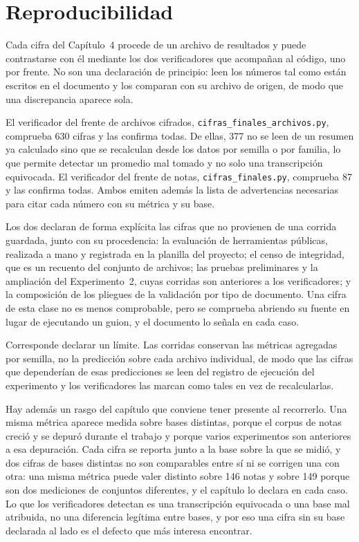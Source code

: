 \section{Reproducibilidad}
\label{apx:reproducibilidad}

Cada cifra del Capítulo~4 procede de un archivo de resultados y puede contrastarse con él mediante los dos verificadores que acompañan al código, uno por frente. No son una declaración de principio: leen los números tal como están escritos en el documento y los comparan con su archivo de origen, de modo que una discrepancia aparece sola.

El verificador del frente de archivos cifrados, \texttt{cifras\_finales\_archivos.py}, comprueba 630 cifras y las confirma todas. De ellas, 377 no se leen de un resumen ya calculado sino que se recalculan desde los datos por semilla o por familia, lo que permite detectar un promedio mal tomado y no solo una transcripción equivocada. El verificador del frente de notas, \texttt{cifras\_finales.py}, comprueba 87 y las confirma todas. Ambos emiten además la lista de advertencias necesarias para citar cada número con su métrica y su base.

Los dos declaran de forma explícita las cifras que no provienen de una corrida guardada, junto con su procedencia: la evaluación de herramientas públicas, realizada a mano y registrada en la planilla del proyecto; el censo de integridad, que es un recuento del conjunto de archivos; las pruebas preliminares y la ampliación del Experimento~2, cuyas corridas son anteriores a los verificadores; y la composición de los pliegues de la validación por tipo de documento. Una cifra de esta clase no es menos comprobable, pero se comprueba abriendo su fuente en lugar de ejecutando un guion, y el documento lo señala en cada caso.

Corresponde declarar un límite. Las corridas conservan las métricas agregadas por semilla, no la predicción sobre cada archivo individual, de modo que las cifras que dependerían de esas predicciones se leen del registro de ejecución del experimento y los verificadores las marcan como tales en vez de recalcularlas.

Hay además un rasgo del capítulo que conviene tener presente al recorrerlo. Una misma métrica aparece medida sobre bases distintas, porque el corpus de notas creció y se depuró durante el trabajo y porque varios experimentos son anteriores a esa depuración. Cada cifra se reporta junto a la base sobre la que se midió, y dos cifras de bases distintas no son comparables entre sí ni se corrigen una con otra: una misma métrica puede valer distinto sobre 146 notas y sobre 149 porque son dos mediciones de conjuntos diferentes, y el capítulo lo declara en cada caso. Lo que los verificadores detectan es una transcripción equivocada o una base mal atribuida, no una diferencia legítima entre bases, y por eso una cifra sin su base declarada al lado es el defecto que más interesa encontrar.

